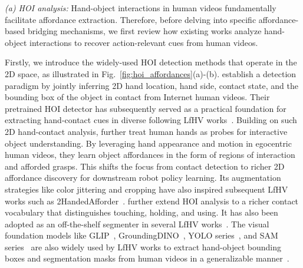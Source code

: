 \documentclass[Afour,sageh,times]{sagej}
\begin{document}
\textit{(a) HOI analysis:} Hand-object interactions in human videos fundamentally facilitate affordance extraction. Therefore, before delving into specific affordance-based bridging mechanisms, we first review how existing works analyze hand-object interactions to recover action-relevant cues from human videos.

Firstly, we introduce the widely-used HOI detection methods that operate in the 2D space, as illustrated in Fig.~\ref{fig:hoi_affordances}(a)-(b). \cite{shan2020understanding} establish a detection paradigm by jointly inferring 2D hand location, hand side, contact state, and the bounding box of the object in contact from Internet human videos. Their pretrained HOI detector has subsequently served as a practical foundation for extracting hand-contact cues in diverse following LfHV works~\citep{bahl2022human,bahl2023affordances,wang2023mimicplay,kumar2023graph,mendonca2023structured,srirama2024hrp,ju2024robo,jonnavittula2025view,lu2025visual}. Building on such 2D hand-contact analysis, \cite{goyal2022human} further treat human hands as probes for interactive object understanding. By leveraging hand appearance and motion in egocentric human videos, they learn object affordances in the form of regions of interaction and afforded grasps. This shifts the focus from contact detection to richer 2D affordance discovery for downstream robot policy learning. Its augmentation strategies like color jittering and cropping have also inspired subsequent LfHV works such as 2HandedAfforder~\citep{heidinger20252handedafforder}. \cite{cheng2023towards} further extend HOI analysis to a richer contact vocabulary that distinguishes touching, holding, and using. It has also been adopted as an off-the-shelf segmenter in several LfHV works~\citep{heppert2024ditto,shan2025slot,wang2026paws}. The visual foundation models like GLIP~\citep{li2022grounded}, GroundingDINO~\citep{liu2024grounding}, YOLO series~\citep{Ultralytics2023,khanam2024yolov5,sohan2024review,cheng2024yolo}, and SAM series~\cite{kirillov2023segment,zhang2023faster,ren2024grounded,ravi2024sam,carion2025sam} are also widely used by LfHV works to extract hand-object bounding boxes and segmentation masks from human videos in a generalizable manner~\citep{xu2024flow,wang2024vlm,ma2025madiff,yoshida2025developing,ma2025uni,ma2025egoloc,li2025h2r,chen2025visa,hsu2025spot,xiong2025ag2x2}.
\end{document}

